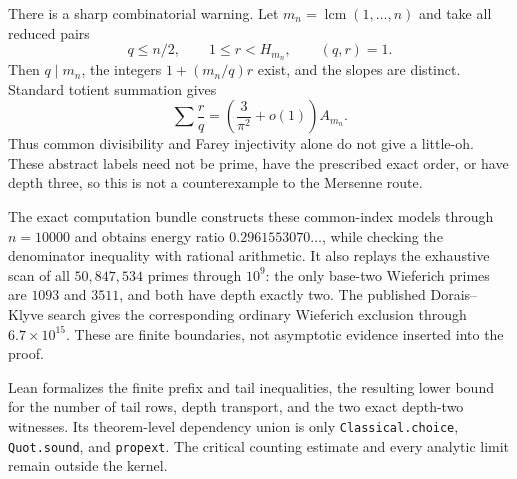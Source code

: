 There is a sharp combinatorial warning.  Let
$m_n=\operatorname{lcm}(1,\ldots,n)$ and take all reduced pairs
\[
 q\le n/2,\qquad 1\le r<H_{m_n},\qquad (q,r)=1.
\]
Then $q\mid m_n$, the integers $1+(m_n/q)r$ exist, and the slopes are
distinct.  Standard totient summation gives
\[
 \sum\frac rq=\left(\frac3{\pi^2}+o(1)\right)A_{m_n}.
\]
Thus common divisibility and Farey injectivity alone do not give a
little-oh.  These abstract labels need not be prime, have the prescribed
exact order, or have depth three, so this is not a counterexample to the
Mersenne route.

The exact computation bundle constructs these common-index models through
$n=10000$ and obtains energy ratio $0.2961553070\ldots$, while checking the
denominator inequality with rational arithmetic.  It also replays the
exhaustive scan of all $50{,}847{,}534$ primes through $10^9$: the only
base-two Wieferich primes are $1093$ and $3511$, and both have depth exactly
two.  The published Dorais--Klyve search gives the corresponding ordinary
Wieferich exclusion through $6.7\times10^{15}$.  These are finite boundaries,
not asymptotic evidence inserted into the proof.

Lean formalizes the finite prefix and tail inequalities, the resulting lower
bound for the number of tail rows, depth transport, and the two exact
depth-two witnesses.  Its theorem-level dependency union is only
\texttt{Classical.choice}, \texttt{Quot.sound}, and \texttt{propext}.  The
critical counting estimate and every analytic limit remain outside the
kernel.
